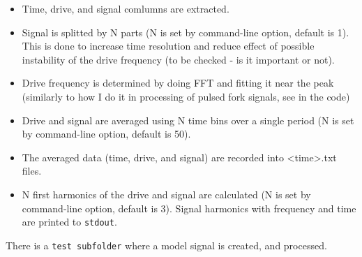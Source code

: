 \documentclass{article}
\begin{document}
\begin{itemize}
\item Time, drive, and signal comlumns are extracted.

\item Signal is splitted by N parts (N is set by command-line option, default is 1).
This is done to increase time resolution and reduce effect of possible instability
of the drive frequency (to be checked - is it important or not).

\item Drive frequency is determined by doing FFT and fitting it near the peak
(similarly to how I do it in processing of pulsed fork signals, see in the code)

\item Drive and signal are averaged using N time bins over a single period (N is
set by command-line option, default is 50).

\item The averaged data (time, drive, and signal) are recorded into
<time>.txt files.

\item N first harmonics of the drive and signal are calculated (N is set
by command-line option, default is 3). Signal harmonics with frequency
and time are printed to {\tt stdout}.

\end{itemize}

There is a {\tt test subfolder} where a model signal is created, and processed.
\end{document}
